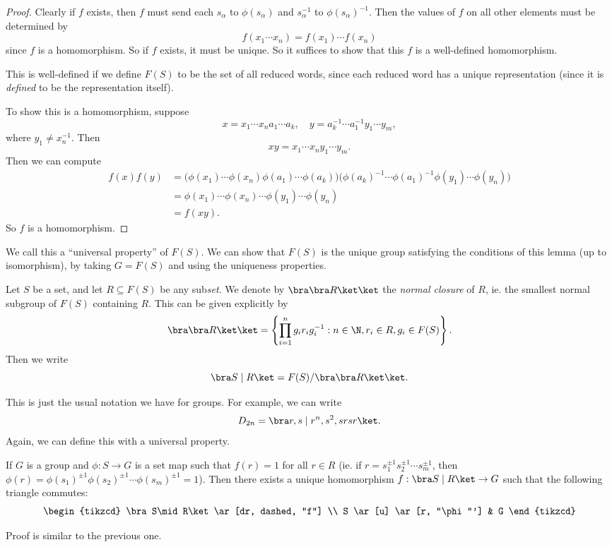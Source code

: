 \documentclass[a4paper]{article}
\begin{document}
\begin{proof}
  Clearly if $f$ exists, then $f$ must send each $s_\alpha$ to $\phi(s_\alpha)$ and $s_\alpha^{-1}$ to $\phi(s_\alpha)^{-1}$. Then the values of $f$ on all other elements must be determined by
  \[
    f(x_1\cdots x_n) = f(x_1)\cdots f(x_n)
  \]
  since $f$ is a homomorphism. So if $f$ exists, it must be unique. So it suffices to show that this $f$ is a well-defined homomorphism.

  This is well-defined if we define $F(S)$ to be the set of all reduced words, since each reduced word has a unique representation (since it is \emph{defined} to be the representation itself).

  To show this is a homomorphism, suppose
  \[
    x = x_1\cdots x_n a_1\cdots a_k,\quad y = a_k^{-1} \cdots a_1^{-1} y_1\cdots y_m,
  \]
  where $y_1 \not= x_n^{-1}$. Then
  \[
    xy = x_1 \cdots x_n y_1\cdots y_m.
  \]
  Then we can compute
  \begin{align*}
    f(x)f(y) &= \big(\phi(x_1)\cdots \phi(x_n) \phi(a_1) \cdots \phi(a_k)\big) \big(\phi(a_k)^{-1} \cdots \phi(a_1)^{-1}\phi(y_1)\cdots\phi(y_n)\big) \\
    &= \phi(x_1)\cdots\phi(x_n) \cdots \phi(y_1)\cdots \phi(y_n) \\
    &= f(xy).
  \end{align*}
  So $f$ is a homomorphism.
\end{proof}
We call this a ``universal property'' of $F(S)$. We can show that $F(S)$ is the unique group satisfying the conditions of this lemma (up to isomorphism), by taking $G = F(S)$ and using the uniqueness properties.

\begin{defi}
  Let $S$ be a set, and let $R \subseteq F(S)$ be any sub\emph{set}. We denote by $\bra \bra R\ket\ket$ the \emph{normal closure} of $R$, ie. the smallest normal subgroup of $F(S)$ containing $R$. This can be given explicitly by
  \[
    \bra \bra R\ket \ket = \left\{\prod_{i = 1}^n g_i r_i g_i^{-1}: n \in \N, r_i \in R, g_i \in F(S)\right\}.
  \]
  Then we write
  \[
    \bra S \mid R\ket = F(S)/\bra\bra R\ket\ket.
  \]
\end{defi}
This is just the usual notation we have for groups. For example, we can write
\[
  D_{2n} = \bra r, s \mid r^n, s^2, srsr\ket.
\]
Again, we can define this with a universal property.
\begin{lemma}
  If $G$ is a group and $\phi: S \to G$ is a set map such that $f(r) = 1$ for all $r \in R$ (ie. if $r = s_1^{\pm 1}s_2^{\pm 1}\cdots s_m^{\pm 1}$, then $\phi(r) = \phi(s_1)^{\pm 1}\phi(s_2)^{\pm 1} \cdots \phi(s_m)^{\pm 1} = 1$). Then there exists a unique homomorphism $f: \bra S \mid R\ket \to G$ such that the following triangle commutes:
  \[
    \begin{tikzcd}
      \bra S\mid R\ket \ar[dr, dashed, "f"] \\
      S \ar[u] \ar[r, "\phi"'] & G
    \end{tikzcd}
  \]
\end{lemma}
Proof is similar to the previous one.
\end{document}
